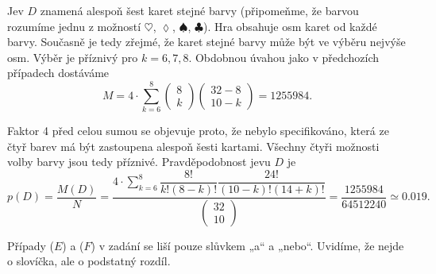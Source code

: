 \begin{example}
    Jev \(D\) znamená alespoň šest karet stejné barvy (připomeňme, že barvou rozumíme jednu z 
    možností \(\heartsuit\), \(\lozenge\), \(\spadesuit\), \(\clubsuit\)). Hra obsahuje osm karet 
    od každé barvy. Současně je tedy zřejmé, že karet stejné barvy může být ve výběru nejvýše osm. 
    Výběr je příznivý pro \(k = 6, 7, 8\). Obdobnou úvahou jako v předchozích případech dostáváme
    \begin{equation*}
      M = 4\cdot\sum^{8}_{k=6}
          \begin{pmatrix} 8 \\ k \end{pmatrix}\begin{pmatrix} 32 - 8 \\ 10 - k\end{pmatrix}
        = \num{1255984}.
    \end{equation*}
    
    Faktor \num{4} před celou sumou se objevuje proto, že nebylo specifikováno, která ze čtyř barev 
    má být zastoupena alespoň šesti kartami. Všechny čtyři možnosti volby barvy jsou tedy příznivé. 
    Pravděpodobnost jevu \(D\) je
    \begin{equation*}
      p(D)  = \dfrac{M(D)}{N}
            = \dfrac{4\cdot\sum^{8}_{k=6}\dfrac{8!}{k!(8-k)!}\dfrac{24!}{(10-k)!(14+k)!}}
                    {\begin{pmatrix} 32 \\ 10 \end{pmatrix}}                               
            = \dfrac{\num{1255984}}{\num{64512240}} \simeq \num{0.019}.
    \end{equation*}
    
    Případy (\(E\)) a (\(F\)) v zadání se liší pouze slůvkem „a“ a „nebo“. Uvidíme, že nejde o 
    slovíčka, ale o podstatný rozdíl. 
    

\end{example}
